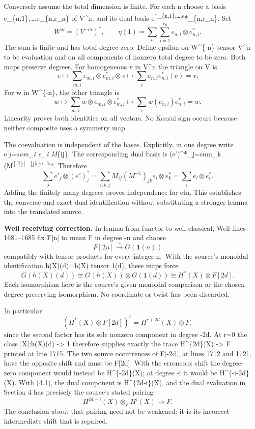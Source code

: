 \documentclass[11pt]{article}
\begin{document}
Conversely assume the total dimension is finite. For each n choose a basis e\_\{n,1\},\ldots,e\_\{n,r\_n\} of V\^{}n, and its dual basis e\textsuperscript{*\_\{n,1\},\ldots,e}*\_\{n,r\_n\}. Set \[
W^m=(V^{-m})^*,\qquad
\eta(1)=\sum_n\sum_{i=1}^{r_n}e_{n,i}\otimes e^*_{n,i}.
\] The sum is finite and has total degree zero. Define epsilon on W\^{}\{-n\} tensor V\^{}n to be evaluation and on all components of nonzero total degree to be zero. Both maps preserve degrees. For homogeneous v in V\^{}n the triangle on V is \[
v\longmapsto
\sum_{m,i}e_{m,i}\otimes e^*_{m,i}\otimes v
\longmapsto
\sum_i e_{n,i}e^*_{n,i}(v)=v.
\] For w in W\^{}\{-n\}, the other triangle is \[
w\longmapsto
\sum_{m,i}w\otimes e_{m,i}\otimes e^*_{m,i}
\longmapsto
\sum_i w(e_{n,i})e^*_{n,i}=w.
\] Linearity proves both identities on all vectors. No Koszul sign occurs because neither composite uses a symmetry map.

The coevaluation is independent of the bases. Explicitly, in one degree write e'\emph{j=sum\_i e\_i M}\{ij\}. The corresponding dual basis is (e')\^{}*\_j=sum\_k (M\textsuperscript{\{-1\})\_\{jk\}e\_k}*. Therefore \[
\sum_j e'_j\otimes(e')^*_j
=\sum_{i,k,j}M_{ij}(M^{-1})_{jk}e_i\otimes e_k^*
=\sum_i e_i\otimes e_i^*.
\] Adding the finitely many degrees proves independence for eta. This establishes the converse and exact dual identification without substituting a stronger lemma into the translated source.

\textbf{Weil receiving correction.} In lemma-from-functor-to-weil-classical, Weil lines 1681--1685 fix F{[}n{]} to mean F in degree -n and choose \[
F[2n]\xrightarrow{\sim}G(\mathbf1(n))
\] compatibly with tensor products for every integer n.~With the source's monoidal identification h(X)(d)=h(X) tensor 1(d), these maps force \[
G(h(X)(d))
\cong G(h(X))\otimes G(\mathbf1(d))
\cong H^*(X)\otimes F[2d].                                \tag{4.1}
\] Each isomorphism here is the source's given monoidal comparison or the chosen degree-preserving isomorphism. No coordinate or twist has been discarded.

In particular \[
(H^*(X)\otimes F[2d])^r
 = H^{r+2d}(X)\otimes F,
\] since the second factor has its sole nonzero component in degree -2d. At r=0 the class {[}X{]}:h(X)(d) -\textgreater{} 1 therefore supplies exactly the trace H\^{}\{2d\}(X) -\textgreater{} F printed at line 1715. The two source occurrences of F{[}-2d{]}, at lines 1712 and 1721, have the opposite shift and must be F{[}2d{]}. With the erroneous shift the degree-zero component would instead be H\^{}\{-2d\}(X); at degree -i it would be H\^{}\{-i-2d\}(X). With (4.1), the dual component is H\^{}\{2d-i\}(X), and the dual evaluation in Section 4 has precisely the source's stated pairing \[
H^{2d-i}(X)\otimes_F H^i(X)\longrightarrow F.
\] The conclusion about that pairing need not be weakened: it is its incorrect intermediate shift that is repaired.
\end{document}
